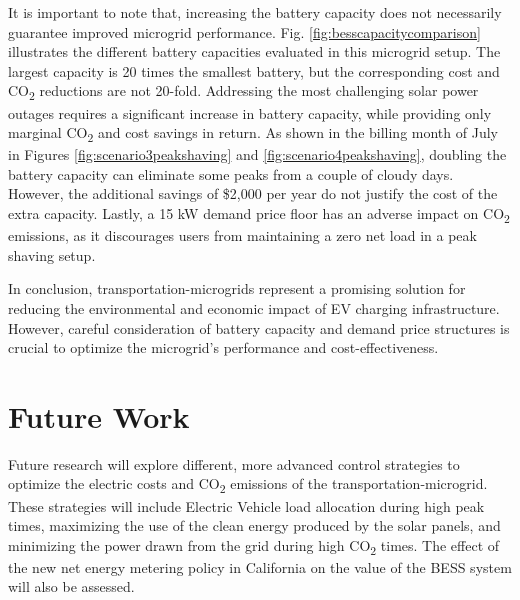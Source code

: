 \documentclass[conference]{IEEEtran}
\begin{document}
		It is important to note that, increasing the battery capacity does not necessarily guarantee improved microgrid performance. Fig. \ref{fig:besscapacitycomparison} illustrates the different battery capacities evaluated in this microgrid setup. The largest capacity is 20 times the smallest battery, but the corresponding cost and CO\textsubscript{2} reductions are not 20-fold. Addressing the most challenging solar power outages requires a significant increase in battery capacity, while providing only marginal CO\textsubscript{2} and cost savings in return. As shown in the billing month of July in Figures \ref{fig:scenario3peakshaving} and \ref{fig:scenario4peakshaving}, doubling the battery capacity can eliminate some peaks from a couple of cloudy days. However, the additional savings of \$2,000 per year do not justify the cost of the extra capacity. Lastly, a 15 kW demand price floor has an adverse impact on CO\textsubscript{2} emissions, as it discourages users from maintaining a zero net load in a peak shaving setup. 
		
		In conclusion, transportation-microgrids represent a promising solution for reducing the environmental and economic impact of EV charging infrastructure. However, careful consideration of battery capacity and demand price structures is crucial to optimize the microgrid's performance and cost-effectiveness.

	\section{Future Work}
		  Future research will explore different, more advanced control strategies to optimize the electric costs and CO\textsubscript{2} emissions of the transportation-microgrid. These strategies will include Electric Vehicle load allocation during high peak times, maximizing the use of the clean energy produced by the solar panels, and minimizing the power drawn from the grid during high CO\textsubscript{2} times. The effect of the new net energy metering policy in California on the value of the BESS system will also be assessed.
		
		
		
\end{document}

